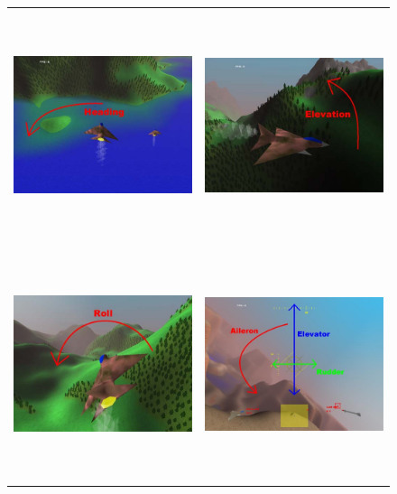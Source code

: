 \begin{figure}
\begin{tabular}{p{7.2cm}p{7.2cm}}
\begin{center}
\includegraphics[width=7.2cm,height=6cm]{heading.jpg}
\label{fig:heading}
\end{center} &
\begin{center}
\includegraphics[width=7.2cm,height=6cm]{elevation.jpg}
\label{fig:elevation}
\end{center}\\
\begin{center}
\includegraphics[width=7.2cm,height=6cm]{roll.jpg}
\label{fig:roll}
\end{center} &
\begin{center}
\includegraphics[width=7.2cm,height=6cm]{fly.jpg}

\end{center}
\end{tabular}
\end{figure}
